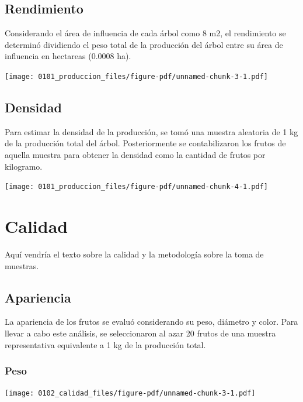 \documentclass[
  letterpaper,
  DIV=11,
  numbers=noendperiod]{scrreprt}
\begin{document}
\section{Rendimiento}\label{rendimiento}

Considerando el área de influencia de cada árbol como 8 m2, el
rendimiento se determinó dividiendo el peso total de la producción del
árbol entre su área de influencia en hectareas (0.0008 ha).

\begin{center}
\texttt{[image: 0101\_produccion\_files/figure-pdf/unnamed-chunk-3-1.pdf]}
\end{center}

\section{Densidad}\label{densidad}

Para estimar la densidad de la producción, se tomó una muestra aleatoria
de 1 kg de la producción total del árbol. Posteriormente se
contabilizaron los frutos de aquella muestra para obtener la densidad
como la cantidad de frutos por kilogramo.

\begin{center}
\texttt{[image: 0101\_produccion\_files/figure-pdf/unnamed-chunk-4-1.pdf]}
\end{center}

\chapter{Calidad}\label{calidad}

Aquí vendría el texto sobre la calidad y la metodología sobre la toma de
muestras.

\section{Apariencia}\label{apariencia}

La apariencia de los frutos se evaluó considerando su peso, diámetro y
color. Para llevar a cabo este análisis, se seleccionaron al azar 20
frutos de una muestra representativa equivalente a 1 kg de la producción
total.

\subsection{Peso}\label{peso}

\begin{center}
\texttt{[image: 0102\_calidad\_files/figure-pdf/unnamed-chunk-3-1.pdf]}
\end{center}
\end{document}
